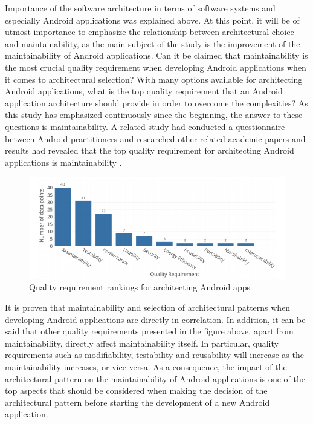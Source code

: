 Importance of the software architecture in terms of software systems and especially Android applications was explained above. At this point, it will be of utmost importance to emphasize the relationship between architectural choice and maintainability, as the main subject of the study is the improvement of the maintainability of Android applications. Can it be claimed that maintainability is the most crucial quality requirement when developing Android applications when it comes to architectural selection? With many options available for architecting Android applications, what is the top quality requirement that an Android application architecture should provide in order to overcome the complexities? As this study has emphasized continuously since the beginning, the answer to these questions is maintainability. A related study had conducted a questionnaire between Android practitioners and researched other related academic papers and results had revealed that the top quality requirement for architecting Android applications is maintainability \cite{14}.
\begin{figure}[ht!]
    \centering
    \includegraphics[scale=0.6]{figures/quality_req.png}
    \caption{Quality requirement rankings for architecting Android apps \protect\cite{14}}
    \label{fig:arch_quality_req_ranking}
\end{figure}

It is proven that maintainability and selection of architectural patterns when developing Android applications are directly in correlation. In addition, it can be said that other quality requirements presented in the figure above, apart from maintainability, directly affect maintainability itself. In particular, quality requirements such as modifiability, testability and reusability will increase as the maintainability increases, or vice versa. As a consequence, the impact of the architectural pattern on the maintainability of Android applications is one of the top aspects that should be considered when making the decision of the architectural pattern before starting the development of a new Android application.